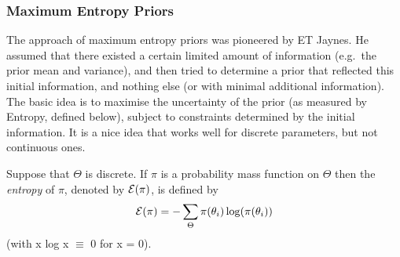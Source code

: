 \documentclass[12pt]{article}
\begin{document}
\subsubsection{Maximum Entropy Priors}

The approach of maximum entropy priors
was pioneered by ET Jaynes. He assumed that there existed a certain limited
amount of information (e.g.~the prior mean and variance), 
and then tried to determine a prior that reflected this initial information,
and nothing else (or with minimal additional information). 
The basic idea is to maximise the uncertainty of the prior (as measured by Entropy, defined
below), subject to constraints determined by the initial information. It is a nice
idea that works well for discrete parameters, but not continuous ones.

Suppose that $\Theta$ is discrete.  If $\pi$ is a probability mass
function on $\Theta$  then the
{\it entropy} of $\pi$, denoted by ${\cal{E}}(\pi)$, is defined by
$${\cal{E}} (\pi)= - \sum_{\Theta} \pi(\theta_i) \log(\pi(\theta_i))$$
(with x log x $\equiv$ 0 for x = 0).
\end{document}
